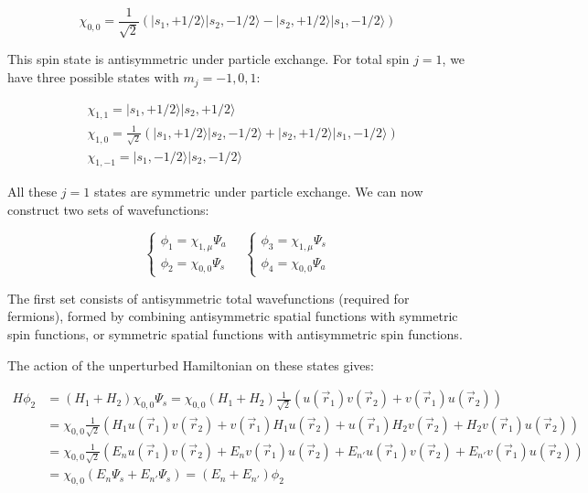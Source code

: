 \documentclass[italian]{HKNdocument}
\begin{document}
\begin{equation}
\chi_{0,0}=\frac{1}{\sqrt{2}}(|s_1,+1/2\rangle|s_2,-1/2\rangle-|s_2,+1/2\rangle|s_1,-1/2\rangle)
\end{equation}

This spin state is antisymmetric under particle exchange. For total spin $j=1$, we have three possible states with $m_j=-1,0,1$:

\begin{align}
&\chi_{1,1}=|s_1,+1/2\rangle|s_2,+1/2\rangle\\
&\chi_{1,0}=\frac{1}{\sqrt{2}}(|s_1,+1/2\rangle|s_2,-1/2\rangle+|s_2,+1/2\rangle|s_1,-1/2\rangle) \\
&\chi_{1,-1}=|s_1,-1/2\rangle|s_2,-1/2\rangle
\end{align}

All these $j=1$ states are symmetric under particle exchange. We can now construct two sets of wavefunctions:

\[
\left\{\begin{array}{l}
\phi_1=\chi_{1,\mu}\Psi_a \\
\phi_2=\chi_{0,0}\Psi_s
\end{array}\right.
\quad
\left\{\begin{array}{l}
\phi_3=\chi_{1,\mu}\Psi_s\\
\phi_4=\chi_{0,0}\Psi_a
\end{array}\right.
\]

The first set consists of antisymmetric total wavefunctions (required for fermions), formed by combining antisymmetric spatial functions with symmetric spin functions, or symmetric spatial functions with antisymmetric spin functions.

The action of the unperturbed Hamiltonian on these states gives:

\begin{align}
H\phi_2&=(H_1+H_2)\chi_{0,0}\Psi_s=\chi_{0,0}(H_1+H_2)\frac{1}{\sqrt{2}}(u(\vec{r}_1)v(\vec{r}_2)+v(\vec{r}_1)u(\vec{r}_2))\\
&=\chi_{0,0}\frac{1}{\sqrt{2}}(H_1u(\vec{r}_1)v(\vec{r}_2)+v(\vec{r}_1)H_1u(\vec{r}_2)+u(\vec{r}_1)H_2v(\vec{r}_2)+H_2v(\vec{r}_1)u(\vec{r}_2))\\
&=\chi_{0,0}\frac{1}{\sqrt{2}}(E_nu(\vec{r}_1)v(\vec{r}_2)+E_nv(\vec{r}_1)u(\vec{r}_2)+E_{n'}u(\vec{r}_1)v(\vec{r}_2)+E_{n'}v(\vec{r}_1)u(\vec{r}_2))\\
&=\chi_{0,0}(E_n\Psi_s+E_{n'}\Psi_s)=(E_n+E_{n'})\phi_2
\end{align}
\end{document}
